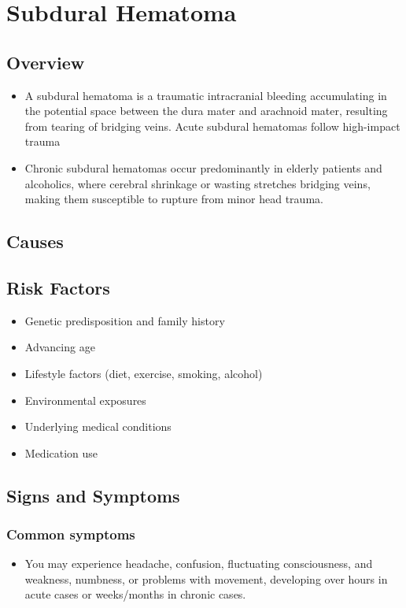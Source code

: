 \chapter{Subdural Hematoma}
\label{sec:Subdural Hematoma}

\section{Overview}


\begin{itemize}[noitemsep]
  \item A subdural hematoma is a traumatic intracranial bleeding accumulating in the potential space between the dura mater and arachnoid mater, resulting from tearing of bridging veins. Acute subdural hematomas follow high-impact trauma
  \item Chronic subdural hematomas occur predominantly in elderly patients and alcoholics, where cerebral shrinkage or wasting stretches bridging veins, making them susceptible to rupture from minor head trauma.
\end{itemize}
\section{Causes}
\section{Risk Factors}

\begin{itemize}[noitemsep]
  \item Genetic predisposition and family history
  \item Advancing age
  \item Lifestyle factors (diet, exercise, smoking, alcohol)
  \item Environmental exposures
  \item Underlying medical conditions
  \item Medication use
\end{itemize}
\section{Signs and Symptoms}

\subsection{Common symptoms}
\begin{itemize}[noitemsep]
  \item You may experience headache, confusion, fluctuating consciousness, and weakness, numbness, or problems with movement, developing over hours in acute cases or weeks/months in chronic cases. 
  \end{itemize}

